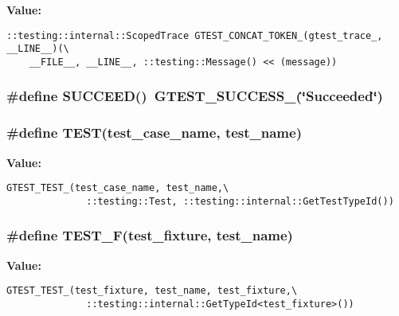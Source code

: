 \textbf{Value:}

\begin{Code}\begin{verbatim}::testing::internal::ScopedTrace GTEST_CONCAT_TOKEN_(gtest_trace_, __LINE__)(\
    __FILE__, __LINE__, ::testing::Message() << (message))
\end{verbatim}
\end{Code}
\subsubsection{\setlength{\rightskip}{0pt plus 5cm}\#define SUCCEED()~GTEST\_\-SUCCESS\_\-(\char`\"{}Succeeded\char`\"{})}\label{gtest_8h_397afb4cfffe2967500d24102fa8a5ec}


\subsubsection{\setlength{\rightskip}{0pt plus 5cm}\#define TEST(test\_\-case\_\-name, test\_\-name)}\label{gtest_8h_598efb903152a27abbe3562ea890d1b9}


\textbf{Value:}

\begin{Code}\begin{verbatim}GTEST_TEST_(test_case_name, test_name,\
              ::testing::Test, ::testing::internal::GetTestTypeId())
\end{verbatim}
\end{Code}
\subsubsection{\setlength{\rightskip}{0pt plus 5cm}\#define TEST\_\-F(test\_\-fixture, test\_\-name)}\label{gtest_8h_65252d195eb5c09683b70370e9447b2f}


\textbf{Value:}

\begin{Code}\begin{verbatim}GTEST_TEST_(test_fixture, test_name, test_fixture,\
              ::testing::internal::GetTypeId<test_fixture>())
\end{verbatim}
\end{Code}

